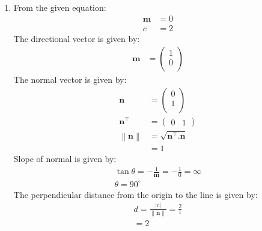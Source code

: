 \documentclass[12pt]{article}
\providecommand{\norm}[1]{\left\lVert#1\right\rVert}
\newcommand{\myvec}[1]{\ensuremath{\begin{pmatrix}#1\end{pmatrix}}}
\let\vec\mathbf
\begin{document}
\begin{enumerate}
\item From the given equation:
         \begin{align}                                                                                                 \vec{m}&=0\\                                                                        			c&=2
         \end{align}                                                                                          The directional vector is given by:
          \begin{align}
                  \vec{m}&=\myvec{1\\0\\}
          \end{align}
          The normal vector is given by:
                  \begin{align}
         \vec{n}&=\myvec{0\\1\\}\\
          \vec{n}^\top&=\myvec{0 & 1}\\
                       \norm{\vec{n}}&=\sqrt{\vec{n}^\top.\vec{n}}\\
                          &=1
                          \end{align}
          Slope of normal is given by:
		\begin{align}                                                                                                 \tan\theta=-\frac{1}{\vec{m}}=-\frac{1}{0}=\infty\\                             \theta=90^\circ
                \end{align}                                                                                 The perpendicular distance from the origin to the line is given by:                                          \begin{align}
			d=\frac{|c|}{\norm{\vec{n}}}=\frac{2}{1}\\                                                              =2
                  \end{align}
\\\\\\\\\\\\ 
\begin{figure}[!h]
\begin{center} 

\end{center}
\end{figure}
\end{enumerate}
\end{document}
